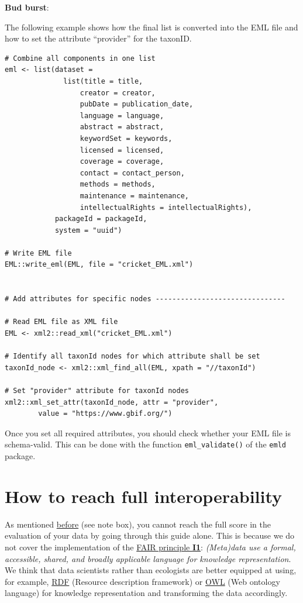 \documentclass[
  oneside]{book}
\begin{document}
\begin{examplebox}

\textbf{Bud burst}:

The following example shows how the final list is converted into the EML file and how to set the attribute ``provider'' for the taxonID.

\begin{verbatim}
# Combine all components in one list
eml <- list(dataset =
              list(title = title,
                  creator = creator,
                  pubDate = publication_date,
                  language = language,
                  abstract = abstract,
                  keywordSet = keywords,
                  licensed = licensed,
                  coverage = coverage,
                  contact = contact_person,
                  methods = methods,
                  maintenance = maintenance,
                  intellectualRights = intellectualRights),
            packageId = packageId, 
            system = "uuid")

# Write EML file
EML::write_eml(EML, file = "cricket_EML.xml")          


# Add attributes for specific nodes -------------------------------

# Read EML file as XML file
EML <- xml2::read_xml("cricket_EML.xml")

# Identify all taxonId nodes for which attribute shall be set
taxonId_node <- xml2::xml_find_all(EML, xpath = "//taxonId")

# Set "provider" attribute for taxonId nodes
xml2::xml_set_attr(taxonId_node, attr = "provider", 
        value = "https://www.gbif.org/")
\end{verbatim}

\end{examplebox}

Once you set all required attributes, you should check whether your EML file is schema-valid. This can be done with the function \texttt{eml\_validate()} of the \texttt{emld} package.

\chapter{How to reach full interoperability}\label{fully-interoperable}

As mentioned \hyperref[evaluation]{before} (see note box), you cannot reach the full score in the evaluation of your data by going through this guide alone. This is because we do not cover the implementation of the \href{https://www.go-fair.org/fair-principles/i1-metadata-use-formal-accessible-shared-broadly-applicable-language-knowledge-representation/}{FAIR principle \textbf{I1}}: \emph{(Meta)data use a formal, accessible, shared, and broadly applicable language for knowledge representation}. We think that data scientists rather than ecologists are better equipped at using, for example, \hyperref[RDF]{RDF} (Resource description framework) or \hyperref[OWL]{OWL} (Web ontology language) for knowledge representation and transforming the data accordingly.
\end{document}
